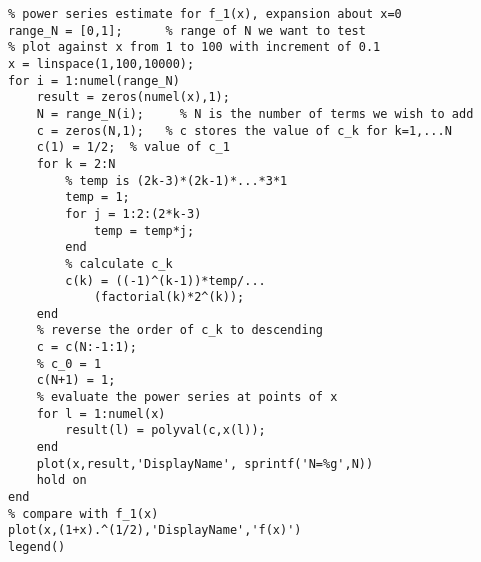 \lstset{basicstyle=\footnotesize,style=myCustomMatlabStyle}
\begin{lstlisting}
% power series estimate for f_1(x), expansion about x=0
range_N = [0,1];      % range of N we want to test
% plot against x from 1 to 100 with increment of 0.1
x = linspace(1,100,10000); 
for i = 1:numel(range_N)
    result = zeros(numel(x),1);
    N = range_N(i);     % N is the number of terms we wish to add
    c = zeros(N,1);   % c stores the value of c_k for k=1,...N
    c(1) = 1/2;  % value of c_1
    for k = 2:N
        % temp is (2k-3)*(2k-1)*...*3*1
        temp = 1;
        for j = 1:2:(2*k-3)
            temp = temp*j;
        end
        % calculate c_k
        c(k) = ((-1)^(k-1))*temp/...
            (factorial(k)*2^(k));
    end
    % reverse the order of c_k to descending
    c = c(N:-1:1);
    % c_0 = 1
    c(N+1) = 1;
    % evaluate the power series at points of x
    for l = 1:numel(x)
        result(l) = polyval(c,x(l));
    end
    plot(x,result,'DisplayName', sprintf('N=%g',N))
    hold on
end
% compare with f_1(x)
plot(x,(1+x).^(1/2),'DisplayName','f(x)')
legend()

\end{lstlisting}